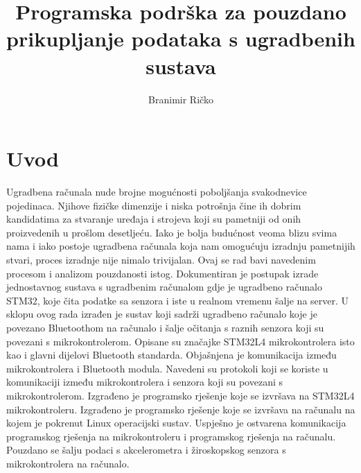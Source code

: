 \documentclass[times, utf8, diplomski]{diplomski}
\begin{document}

\title{Programska podrška za pouzdano prikupljanje podataka s ugradbenih sustava}

\author{Branimir Ričko}

\maketitle


\tableofcontents

\chapter{Uvod}
Ugradbena računala nude brojne mogućnosti poboljšanja svakodnevice pojedinaca.
Njihove fizičke dimenzije i niska potrošnja čine ih dobrim kandidatima za stvaranje uređaja i strojeva koji su pametniji od onih proizvedenih u prošlom desetljeću.
Iako je bolja budućnost veoma blizu svima nama i iako postoje ugradbena računala koja nam omogućuju izradnju pametnijih stvari, proces izradnje nije nimalo trivijalan.
Ovaj se rad bavi navedenim procesom i analizom pouzdanosti istog.
Dokumentiran je postupak izrade jednostavnog sustava s ugradbenim računalom gdje je ugradbeno računalo STM32, koje čita podatke sa senzora i iste u realnom vremenu šalje na server.
U sklopu ovog rada izrađen je sustav koji sadrži ugradbeno računalo koje je povezano Bluetoothom na računalo i šalje očitanja s raznih senzora koji su povezani s mikrokontrolerom.
Opisane su značajke STM32L4 mikrokontrolera isto kao i glavni dijelovi Bluetooth standarda.
Objašnjena je komunikacija između mikrokontrolera i Bluetooth modula.
Navedeni su protokoli koji se koriste u komunikaciji između mikrokontrolera i senzora koji su povezani s mikrokontrolerom.
Izgrađeno je programsko rješenje koje se izvršava na STM32L4 mikrokontroleru.
Izgrađeno je programsko rješenje koje se izvršava na računalu na kojem je pokrenut Linux operacijski sustav.
Uspješno je ostvarena komunikacija programskog rješenja na mikrokontroleru i programskog rješenja na računalu.
Pouzdano se šalju podaci s akcelerometra i žiroskopskog senzora s mikrokontrolera na računalo.
\end{document}
